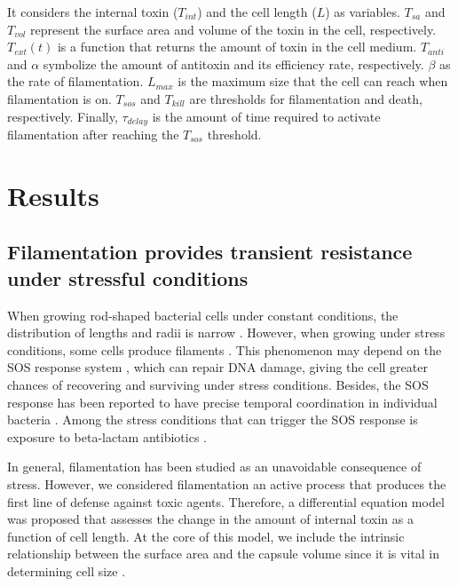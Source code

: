 \documentclass[a4paper, nobind]{templates/ociamthesis}
\begin{document}
It considers the internal toxin (\(T_{int}\)) and the cell length (\(L\)) as variables. \(T_{sa}\) and \(T_{vol}\) represent the surface area and volume of the toxin in the cell, respectively. \(T_{ext}(t)\) is a function that returns the amount of toxin in the cell medium. \(T_{anti}\) and \(\alpha\) symbolize the amount of antitoxin and its efficiency rate, respectively. \(\beta\) as the rate of filamentation. \(L_{max}\) is the maximum size that the cell can reach when filamentation is on. \(T_{sos}\) and \(T_{kill}\) are thresholds for filamentation and death, respectively. Finally, \(\tau_{delay}\) is the amount of time required to activate filamentation after reaching the \(T_{sos}\) threshold.

\hypertarget{results-1}{%
\section{Results}\label{results-1}}

\hypertarget{filamentation-provides-transient-resistance-under-stressful-conditions}{%
\subsection{Filamentation provides transient resistance under stressful conditions}\label{filamentation-provides-transient-resistance-under-stressful-conditions}}

When growing rod-shaped bacterial cells under constant conditions, the distribution of lengths and radii is narrow \autocite{schaechterGrowthCellNuclear1962}. However, when growing under stress conditions, some cells produce filaments \autocite{schaechterDependencyMediumTemperature1958}. This phenomenon may depend on the SOS response system \autocite{bosEmergenceAntibioticResistance2015}, which can repair DNA damage, giving the cell greater chances of recovering and surviving under stress conditions. Besides, the SOS response has been reported to have precise temporal coordination in individual bacteria \autocite{friedmanPreciseTemporalModulation2005}. Among the stress conditions that can trigger the SOS response is exposure to beta-lactam antibiotics \autocite{millerSOSResponseInduction2004}.

In general, filamentation has been studied as an unavoidable consequence of stress. However, we considered filamentation an active process that produces the first line of defense against toxic agents. Therefore, a differential equation model was proposed that assesses the change in the amount of internal toxin as a function of cell length. At the core of this model, we include the intrinsic relationship between the surface area and the capsule volume since it is vital in determining cell size \autocite{harrisRelativeRatesSurface2016}.
\end{document}
